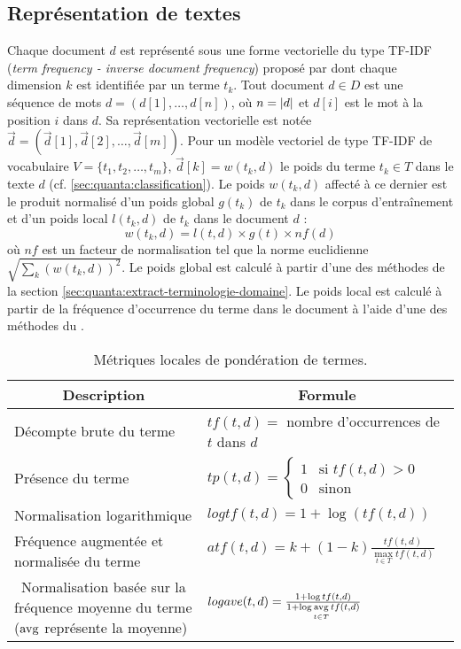 \subsection{Représentation de textes}
Chaque document $d$ est représenté sous une forme vectorielle du type TF-IDF (\textit{term frequency - inverse document frequency}) proposé par \cite{salton1988term-weighting} dont chaque dimension $k$ est identifiée par un terme $t_k$. Tout document $d \in D$ est une séquence de mots $d=(d[1], \dots, d[n])$, où $n = {\vert d\vert}$ et $d[i]$ est le mot à la position $i$ dans $d$. Sa représentation vectorielle est notée $\vec{d}=(\vec{d}[1], \vec{d}[2], \dots, \vec{d}[m])$. Pour un modèle vectoriel de type TF-IDF de vocabulaire $V = \lbrace t_1, t_2, \dots, t_m \rbrace$, $\vec{d}[k] = w(t_k,d)$ le poids du terme $t_k \in T$ dans le texte $d$ ({cf. \ref{sec:quanta:classification}}). Le poids $w(t_k, d)$ affecté à ce dernier est le produit normalisé d'un poids global $g(t_k)$ de $t_k$ dans le corpus d'entraînement et d'un poids local $l(t_k,d)$ de $t_k$ dans le document $d$ : \[w(t_k, d) = l(t,d) \times g(t) \times nf(d)\] où $nf$ est un facteur de normalisation tel que la norme euclidienne $\sqrt{\sum\limits_k (w(t_k,d))^2}$. Le poids global est calculé à partir d'une des méthodes de la section \ref{sec:quanta:extract-terminologie-domaine}. Le poids local est calculé à partir de la fréquence d'occurrence du terme dans le document à l'aide d'une des méthodes du .

\begin{table}[!htb]
	\small\centering
	\begin{tabular}{p{}@{\hskip 0.2in}|p{}}
		\hline
		\multicolumn{1}{c|}{Description} & \multicolumn{1}{c}{Formule} \\
		\hline
		Décompte brute du terme \citep{salton1988term-weighting} & $tf(t,d) = $ nombre d'occurrences de $t$ dans $d$\\ \hline\noalign{\smallskip}
		Présence du terme \citep{salton1988term-weighting} & $tp(t,d) = \left\lbrace \begin{array}{cl}
		1 & \text{si } tf(t,d) > 0 \\
		0 & \text{sinon}
		\end{array} \right.$ \\ \hline
		Normalisation logarithmique & $logtf(t,d) = 1 + \log{\left(tf(t,d)\right)}$ \\ \hline
		Fréquence augmentée et normalisée du terme \citep{salton1988term-weighting}%
		& $atf(t,d) = k + (1-k) \frac{tf(t,d)}{\max\limits_{t \in T} tf(t,d)}$ \\ \hline\
		Normalisation basée sur la fréquence moyenne du terme \citep{manning2009irbook-weighting} ($\mathop{\mathrm{avg}}\limits $ représente la moyenne) & $logave(t,d) = \frac{1+\log {tf(t,d)}}{1 + \log \mathop{\mathrm{avg}}\limits\limits_{t \in T} tf(t, d) }$ \\ 
		\hline
	\end{tabular}
	
	\caption{Métriques locales de pondération de termes.} \label{tab:sensresultat:metriq_locales}
\end{table}

